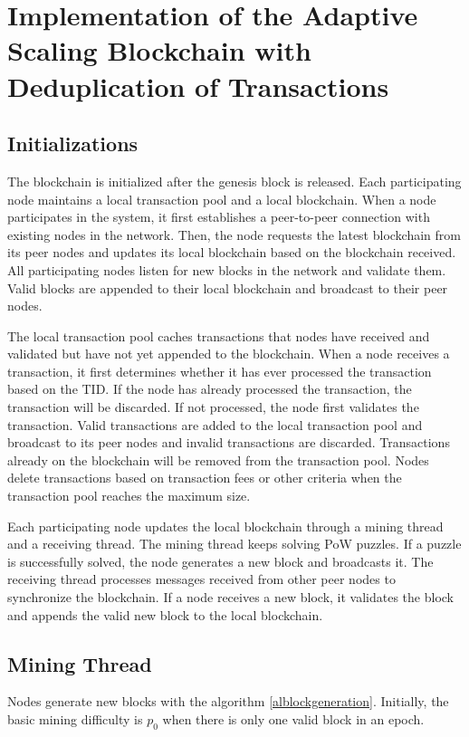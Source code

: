 \documentclass[10pt,journal,compsoc]{IEEEtran}
\begin{document}
	
	
	\section{Implementation of the Adaptive Scaling Blockchain with Deduplication of Transactions} \label{implementation}
	\subsection{Initializations}
	The blockchain is initialized after the genesis block is released. Each participating node maintains a local transaction pool and a local blockchain. When a node participates in the system, it first establishes a peer-to-peer connection with existing nodes in the network. Then, the node requests the latest blockchain from its peer nodes and updates its local blockchain based on the blockchain received. All participating nodes listen for new blocks in the network and validate them. Valid blocks are appended to their local blockchain and broadcast to their peer nodes. 
	
	The local transaction pool caches transactions that nodes have received and validated but have not yet appended to the blockchain. When a node receives a transaction, it first determines whether it has ever processed the transaction based on the TID. If the node has already processed the transaction, the transaction will be discarded. If not processed, the node first validates the transaction. Valid transactions are added to the local transaction pool and broadcast to its peer nodes and invalid transactions are discarded. Transactions already on the blockchain will be removed from the transaction pool. Nodes delete transactions based on transaction fees or other criteria when the transaction pool reaches the maximum size.
	
	Each participating node updates the local blockchain through a mining thread and a receiving thread. The mining thread keeps solving PoW puzzles. If a puzzle is successfully solved, the node generates a new block and broadcasts it. The receiving thread processes messages received from other peer nodes to synchronize the blockchain. If a node receives a new block, it validates the block and appends the valid new block to the local blockchain.
	
	\subsection {Mining Thread}
	Nodes generate new blocks with the algorithm \ref{alblockgeneration}. Initially, the basic mining difficulty is $p_0$ when there is only one valid block in an epoch. 
	
\end{document}
